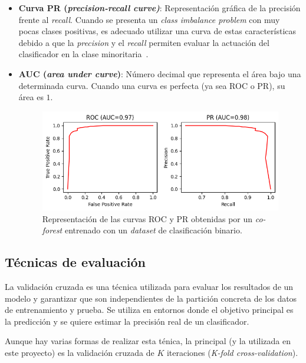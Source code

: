 \begin{itemize}
	\item \textbf{Curva PR (\textit{precision-recall curve)}}:  Representación gráfica de la precisión frente al \textit{recall}. Cuando se presenta un \textit{class imbalance problem} con muy pocas clases positivas, es adecuado utilizar una curva de estas características debido a que la \textit{precision} y el \textit{recall} permiten evaluar la actuación del clasificador en la clase minoritaria~\cite{imbalanced2013Haibo}.
	
	\item \textbf{AUC (\textit{area under curve})}: Número decimal que representa el área bajo una determinada curva. Cuando una curva es perfecta (ya sea ROC o PR), su área es $1$.
	
	\begin{figure}[h]
		\caption[Métricas: AUC curvas ROC y PR]{Representación de las curvas ROC y PR obtenidas por un \textit{co-forest} entrenado con un \textit{dataset} de clasificación binario.}
		\label{img:curva_roc_pr}
		\centering
		\includegraphics[scale=0.7]{../img/memoria/3_auc_roc_pr}
	\end{figure}
	
\end{itemize}

\subsection{Técnicas de evaluación}


La validación cruzada es una técnica utilizada para evaluar los resultados de un modelo y garantizar que son independientes de la partición concreta de los datos de entrenamiento y prueba. Se utiliza en entornos donde el objetivo principal es la predicción y se quiere estimar la precisión real de un clasificador. 

Aunque hay varias formas de realizar esta ténica, la principal (y la utilizada en este proyecto) es la validación cruzada de $K$ iteraciones (\textit{K-fold cross-validation}).

